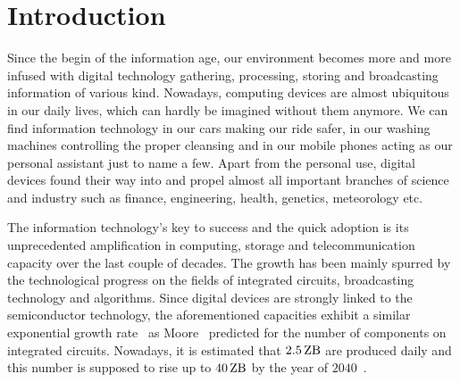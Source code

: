 \documentclass{dima}
\begin{document}
\date{\today}


\maketitle



\section{Introduction}
Since the begin of the information age, our environment becomes more and more infused with digital technology gathering, processing, storing and broadcasting information of various kind.
Nowadays, computing devices are almost ubiquitous in our daily lives, which can hardly be imagined without them anymore.
We can find information technology in our cars making our ride safer, in our washing machines controlling the proper cleansing and in our mobile phones acting as our personal assistant just to name a few.
Apart from the personal use, digital devices found their way into and propel almost all important branches of science and industry such as finance, engineering, health, genetics, meteorology etc.

The information technology's key to success and the quick adoption is its unprecedented amplification in computing, storage and telecommunication capacity over the last couple of decades.
The growth has been mainly spurred by the technological progress on the fields of integrated circuits, broadcasting technology and algorithms.
Since digital devices are strongly linked to the semiconductor technology, the aforementioned capacities exhibit a similar exponential growth rate~\cite{hilbert:s2011a} as Moore~\cite{moore:1965a} predicted for the number of components on integrated circuits.
Nowadays, it is estimated that $\SI{2.5}{\zetta\byte}$ are produced daily and this number is supposed to rise up to $\SI{40}{\zetta\byte}$ by the year of $\num{2040}$~\cite{ibm:2014a}.
\end{document}
